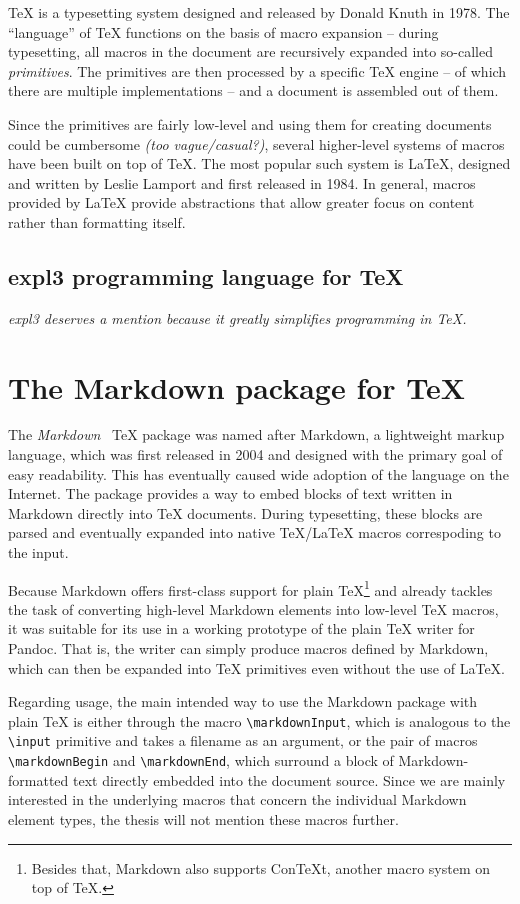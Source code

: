 \documentclass[
  digital,     %
  oneside,     %
  nosansbold,  %
  nocolorbold, %
  lof,         %
  lot,         %
]{fithesis4}
\newcommand{\macro}[1]{\texttt{\textbackslash{}{#1}}}
\begin{document}
\TeX{} is a typesetting system designed and released by Donald Knuth in 1978. The ``language'' of \TeX{} functions on the basis of macro expansion -- during typesetting, all macros in the document are recursively expanded into so-called \textit{primitives}. The primitives are then processed by a specific \TeX{} engine -- of which there are multiple implementations -- and a document is assembled out of them.

Since the primitives are fairly low-level and using them for creating documents could be cumbersome \textit{(too vague/casual?)}, several higher-level systems of macros have been built on top of \TeX{}. The most popular such system is \LaTeX{}, designed and written by Leslie Lamport and first released in 1984. In general, macros provided by \LaTeX{} provide abstractions that allow greater focus on content rather than formatting itself.

\subsection{expl3 programming language for \TeX{}}
\emph{expl3 deserves a mention because it greatly simplifies programming in \TeX{}.}

\section{The Markdown package for \TeX{}}
The \emph{Markdown}~\cite{cstug-markdown} \TeX{} package was named after Markdown, a lightweight markup language, which was first released in 2004 and designed with the primary goal of easy readability. This has eventually caused wide adoption of the language on the Internet. The package provides a way to embed blocks of text written in Markdown directly into \TeX{} documents. During typesetting, these blocks are parsed and eventually expanded into native \TeX{}/\LaTeX{} macros correspoding to the input. 

Because Markdown offers first-class support for plain \TeX{}\footnote{Besides that, Markdown also supports Con\TeX{}t, another macro system on top of \TeX{}.} and already tackles the task of converting high-level Markdown elements into low-level \TeX{} macros, it was suitable for its use in a working prototype of the plain \TeX{} writer for Pandoc. That is, the writer can simply produce macros defined by Markdown, which can then be expanded into \TeX{} primitives even without the use of \LaTeX{}.

Regarding usage, the main intended way to use the Markdown package with plain \TeX{} is either through the macro \macro{markdownInput}, which is analogous to the \macro{input} primitive and takes a filename as an argument, or the pair of macros \macro{markdownBegin} and \macro{markdownEnd}, which surround a block of Markdown-formatted text directly embedded into the document source. Since we are mainly interested in the underlying macros that concern the individual Markdown element types, the thesis will not mention these macros further.
\end{document}

